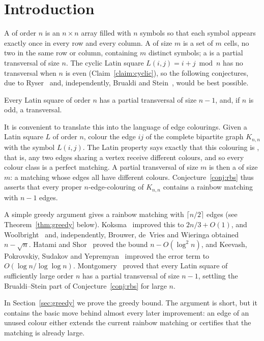 \section{Introduction}\label{sec:intro}

A  of order $n$ is an $n\times n$ array filled with $n$ symbols so that each symbol appears exactly once in every row and every column. A  of size $m$ is a set of $m$ cells, no two in the same row or column, containing $m$ distinct symbols; a  is a partial transversal of size $n$. The cyclic Latin square $L(i,j)=i+j \bmod n$ has no transversal when $n$ is even (Claim~\ref{claim:cyclic}), so the following conjectures, due to Ryser~\cite{ryser1967} and, independently, Brualdi and Stein~\cite{stein1975}, would be best possible.

\begin{conjecture}\label{conj:rbs}
Every Latin square of order $n$ has a partial transversal of size $n-1$, and, if $n$ is odd, a transversal.
\end{conjecture}

It is convenient to translate this into the language of edge colourings. Given a Latin square $L$ of order $n$, colour the edge $ij$ of the complete bipartite graph $K_{n,n}$ with the symbol $L(i,j)$. The Latin property says exactly that this colouring is , that is, any two edges sharing a vertex receive different colours, and so every colour class is a perfect matching. A partial transversal of size $m$ is then a  of size $m$: a matching whose edges all have different colours. Conjecture~\ref{conj:rbs} thus asserts that every proper $n$-edge-colouring of $K_{n,n}$ contains a rainbow matching with $n-1$ edges.


A simple greedy argument gives a rainbow matching with $\lceil n/2\rceil$ edges (see Theorem~\ref{thm:greedy} below). Koksma~\cite{koksma1969} improved this to $2n/3+O(1)$, and Woolbright~\cite{woolbright1978} and, independently, Brouwer, de~Vries and Wieringa obtained $n-\sqrt{n}$. Hatami and Shor~\cite{hatami2008} proved the bound $n-O(\log^2 n)$, and Keevash, Pokrovskiy, Sudakov and Yepremyan~\cite{kpsy2022} improved the error term to $O(\log n/\log\log n)$. Montgomery~\cite{montgomery2023} proved that every Latin square of sufficiently large order $n$ has a partial transversal of size $n-1$, settling the Brualdi--Stein part of Conjecture~\ref{conj:rbs} for large $n$.


In Section~\ref{sec:greedy} we prove the greedy bound. The argument is short, but it contains the basic move behind almost every later improvement: an edge of an unused colour either extends the current rainbow matching or certifies that the matching is already large.

